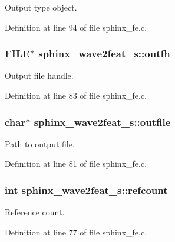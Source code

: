 \-Output type object. 



\-Definition at line 94 of file sphinx\-\_\-fe.\-c.

\subsubsection[{outfh}]{\setlength{\rightskip}{0pt plus 5cm}\-F\-I\-L\-E$\ast$ {\bf sphinx\-\_\-wave2feat\-\_\-s\-::outfh}}\label{structsphinx__wave2feat__s_ad7340fab24fb182cbff2c73fd1fb3671}


\-Output file handle. 



\-Definition at line 83 of file sphinx\-\_\-fe.\-c.

\subsubsection[{outfile}]{\setlength{\rightskip}{0pt plus 5cm}char$\ast$ {\bf sphinx\-\_\-wave2feat\-\_\-s\-::outfile}}\label{structsphinx__wave2feat__s_aa50405dc75074933912da57295ec5fbf}


\-Path to output file. 



\-Definition at line 81 of file sphinx\-\_\-fe.\-c.

\subsubsection[{refcount}]{\setlength{\rightskip}{0pt plus 5cm}int {\bf sphinx\-\_\-wave2feat\-\_\-s\-::refcount}}\label{structsphinx__wave2feat__s_ae9b2fc4bfa6a3adbf2ee5a71796cdb51}


\-Reference count. 



\-Definition at line 77 of file sphinx\-\_\-fe.\-c.


